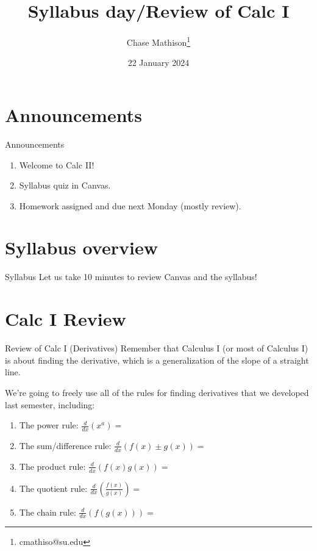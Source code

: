 \documentclass[presentation]{beamer}
\institute[SU]{Shenandoah University}
\author{Chase Mathison\thanks{cmathiso@su.edu}}
\date{22 January 2024}
\title{Syllabus day/Review of Calc I}
\begin{document}
\maketitle

\section{Announcements}
\label{sec:org91e1d97}
\begin{frame}[label={sec:orgef11bc6}]{Announcements}
\begin{enumerate}
\item Welcome to Calc II!
\item Syllabus quiz in Canvas.
\item Homework assigned and due next Monday (mostly review).
\end{enumerate}
\end{frame}

\section{Syllabus overview}
\label{sec:org4c92abd}
\begin{frame}[label={sec:orgaa91359}]{Syllabus}
Let us take 10 minutes to review Canvas and the syllabus!
\end{frame}

\section{Calc I Review}
\label{sec:orgf8b37fd}
\begin{frame}[label={sec:org018a46d}]{Review of Calc I (Derivatives)}
Remember that Calculus I (or most of Calculus I) is about finding the
derivative, which is a generalization of the slope of a straight line.


We're going to freely use all of the rules for finding derivatives
that we developed last semester, including:


\begin{enumerate}
\item The power rule: \(\frac{d}{dx} \left( x^a \right) =\)
\item The sum/difference rule: \(\frac{d}{dx} \left( f(x) \pm g(x) \right)
   =\)
\item The product rule: \(\frac{d}{dx} \left( f(x)g(x) \right) =\)
\item The quotient rule: \(\frac{d}{dx} \left( \frac{f(x)}{g(x)} \right)
   =\)
\item The chain rule: \(\frac{d}{dx} \left( f \left( g(x) \right) \right)
   =\)
\end{enumerate}
\end{frame}
\end{document}
